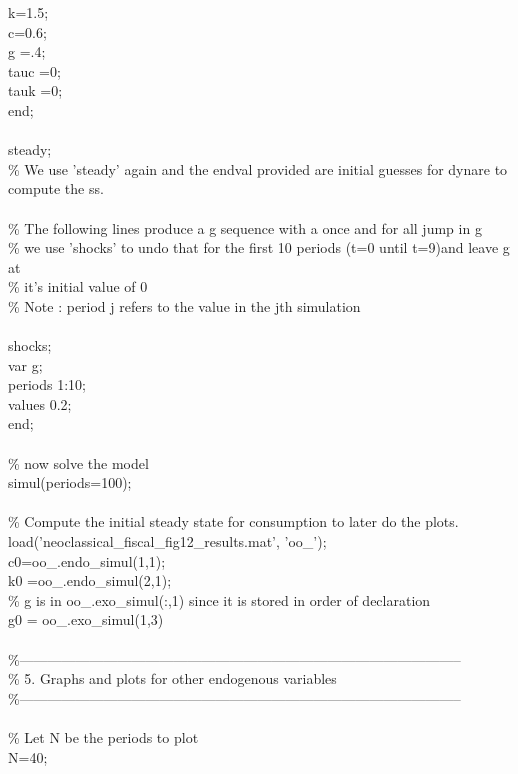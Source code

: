 \documentclass[a4paper,12pt]{scrartcl} %
\begin{document}
k=1.5;\\
c=0.6;\\
g =.4;\\
tauc =0;\\
tauk =0;\\
end;\\
\\
steady;\\
\% We use 'steady' again and the endval provided are initial guesses for dynare to compute the ss.\\
\\
\% The following lines produce a g sequence with a once and for all jump in g\\
\% we use 'shocks' to undo that for the first 10 periods (t=0 until t=9)and leave g at\\
\% it's initial value of 0\\
\% Note :  period j refers to the value in the jth simulation\\
\\
shocks;\\
var g;\\
periods 1:10;\\
values 0.2;\\
end;\\
\\
\% now solve the model\\
simul(periods=100);\\
\\
\% Compute the initial steady state for consumption to later do the plots.\\
load('neoclassical\_fiscal\_fig12\_results.mat', 'oo\_');\\
c0=oo\_.endo\_simul(1,1);\\
k0 =oo\_.endo\_simul(2,1);\\
\% g is in oo\_.exo\_simul(:,1) since it is stored in order of declaration\\
g0 = oo\_.exo\_simul(1,3)\\
\\
\%-----------------------------------------------------------------------------------------------\\
\% 5. Graphs and plots for other endogenous variables\\
\%-----------------------------------------------------------------------------------------------\\
\\
\% Let N be the periods to plot\\
N=40;\\
\end{document}

